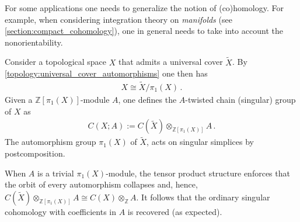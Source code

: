     For some applications one needs to generalize the notion of (co)homology. For example, when considering integration theory on \textit{manifolds} (see \cref{section:compact_cohomology}), one in general needs to take into account the nonorientability.

    Consider a topological space $X$ that admits a universal cover $\widetilde{X}$. By \cref{topology:universal_cover_automorphisms} one then has
    \begin{gather}
        X\cong\widetilde{X}/\pi_1(X)\,.
    \end{gather}
    Given a $\mathbb{Z}[\pi_1(X)]$-module $A$, one defines the $A$-twisted chain (singular) group of $X$ as
    \begin{gather}
        C(X;A):=C(\widetilde{X})\otimes_{\mathbb{Z}[\pi_1(X)]}A\,.
    \end{gather}
    The automorphism group $\pi_1(X)$ of $\widetilde{X}$, acts on singular simplices by postcomposition.

    When $A$ is a trivial $\pi_1(X)$-module, the tensor product structure enforces that the orbit of every automorphism collapses and, hence, $C(\widetilde{X})\otimes_{\mathbb{Z}[\pi_1(X)]}A\cong C(X)\otimes_{\mathbb{Z}}A$. It follows that the ordinary singular cohomology with coefficients in $A$ is recovered (as expected).

\section{}\label{section:eilenberg_steenrod}

